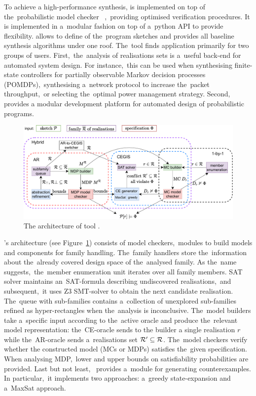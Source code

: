 To achieve a high-performance synthesis, \toolname{} is implemented on top of the~probabilistic model chec\-ker \storm{}~\cite{STORM},~providing optimised verification procedures.
It is implemented in a~modular fashion on top of a~python API to provide flexibility.
\toolname{} allows to define of the~program sketches and provides all baseline synthesis algorithms under one roof.
The~tool finds application primarily for two groups of users.
First,~the~analysis of realisations sets is a~useful back-end for automated system design. %
For instance,~this can be used when synthesising finite-state controllers for partially observable Markov decision processes (POMDPs),~synthesising a~network protocol to increase the~packet throughput,~or selecting the~optimal power management strategy.
Second,~\toolname{} provides a modular development platform for automated design of probabilistic programs.

\begin{figure}[h!]
\centering
\includegraphics[width=1.0\textwidth]{figures/architecture.pdf}
\caption{The architecture of tool \toolname{}.}%
\label{fig:architecture}%
\end{figure}

\toolname{}'s architecture (see Figure~\ref{fig:architecture}) consists of model checkers,~modules to build models and components for family handling.
The~family handlers store the~information about the~already covered design space of the~analysed family.
As the~name suggests,~the~member enumeration unit iterates over all family members.
SAT solver maintains an~SAT-formula describing undiscovered realisations,~and subsequent,~it uses Z3 SMT-solver to obtain the next candidate realisation.
The~queue with sub-families contains a~collection of unexplored sub-families refined as hyper-rectangles when the~analysis is inconclusive.
The~model builders take a~specific input according to the~active oracle and produce the~relevant model representation:
the~CE-oracle sends to the builder a single realisation $r$ while 
the~AR-oracle sends a~realisations set $\mathcal{R}' \subseteq \mathcal{R}$.
The~model checkers verify whether the constructed model (MCs or MDPs) satisfies the~given specification.
When analysing MDP,~lower and upper bounds on satisfiability probabilities are provided.
Last but not least,~\toolname{} provides a~module for generating counterexamples. In particular,~it implements two approaches: a~greedy state-expansion and a~MaxSat approach.

